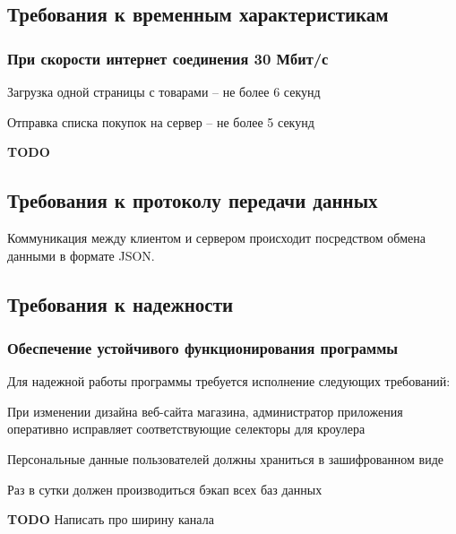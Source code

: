 \subsection{Требования к временным характеристикам}

\subsubsection{При скорости интернет соединения 30 Мбит/с}
\begin{my_enumerate}
\item Загрузка одной страницы с товарами -- не более 6 секунд
\item Отправка списка покупок на сервер -- не более 5 секунд
\item \textbf{TODO}
\end{my_enumerate}


\subsection{Требования к протоколу передачи данных}

Коммуникация между клиентом и сервером происходит посредством обмена данными в формате JSON.

\subsection{Требования к надежности}
\subsubsection{Обеспечение устойчивого функционирования программы}

Для надежной работы программы требуется исполнение следующих требований:
\begin{my_enumerate}
\item При изменении дизайна веб-сайта магазина, администратор приложения оперативно
исправляет соответствующие селекторы для кроулера
\item Персональные данные пользователей должны храниться в зашифрованном виде
\item Раз в сутки должен производиться бэкап всех баз данных
\end{my_enumerate}
\textbf{TODO} Написать про ширину канала \\
